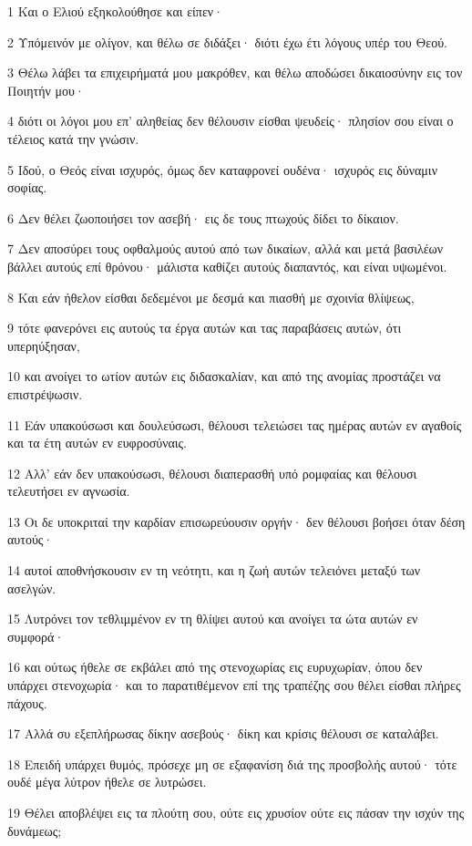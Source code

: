 \par 1 Και ο Ελιού εξηκολούθησε και είπεν·
\par 2 Υπόμεινόν με ολίγον, και θέλω σε διδάξει· διότι έχω έτι λόγους υπέρ του Θεού.
\par 3 Θέλω λάβει τα επιχειρήματά μου μακρόθεν, και θέλω αποδώσει δικαιοσύνην εις τον Ποιητήν μου·
\par 4 διότι οι λόγοι μου επ' αληθείας δεν θέλουσιν είσθαι ψευδείς· πλησίον σου είναι ο τέλειος κατά την γνώσιν.
\par 5 Ιδού, ο Θεός είναι ισχυρός, όμως δεν καταφρονεί ουδένα· ισχυρός εις δύναμιν σοφίας.
\par 6 Δεν θέλει ζωοποιήσει τον ασεβή· εις δε τους πτωχούς δίδει το δίκαιον.
\par 7 Δεν αποσύρει τους οφθαλμούς αυτού από των δικαίων, αλλά και μετά βασιλέων βάλλει αυτούς επί θρόνου· μάλιστα καθίζει αυτούς διαπαντός, και είναι υψωμένοι.
\par 8 Και εάν ήθελον είσθαι δεδεμένοι με δεσμά και πιασθή με σχοινία θλίψεως,
\par 9 τότε φανερόνει εις αυτούς τα έργα αυτών και τας παραβάσεις αυτών, ότι υπερηύξησαν,
\par 10 και ανοίγει το ωτίον αυτών εις διδασκαλίαν, και από της ανομίας προστάζει να επιστρέψωσιν.
\par 11 Εάν υπακούσωσι και δουλεύσωσι, θέλουσι τελειώσει τας ημέρας αυτών εν αγαθοίς και τα έτη αυτών εν ευφροσύναις.
\par 12 Αλλ' εάν δεν υπακούσωσι, θέλουσι διαπερασθή υπό ρομφαίας και θέλουσι τελευτήσει εν αγνωσία.
\par 13 Οι δε υποκριταί την καρδίαν επισωρεύουσιν οργήν· δεν θέλουσι βοήσει όταν δέση αυτούς·
\par 14 αυτοί αποθνήσκουσιν εν τη νεότητι, και η ζωή αυτών τελειόνει μεταξύ των ασελγών.
\par 15 Λυτρόνει τον τεθλιμμένον εν τη θλίψει αυτού και ανοίγει τα ώτα αυτών εν συμφορά·
\par 16 και ούτως ήθελε σε εκβάλει από της στενοχωρίας εις ευρυχωρίαν, όπου δεν υπάρχει στενοχωρία· και το παρατιθέμενον επί της τραπέζης σου θέλει είσθαι πλήρες πάχους.
\par 17 Αλλά συ εξεπλήρωσας δίκην ασεβούς· δίκη και κρίσις θέλουσι σε καταλάβει.
\par 18 Επειδή υπάρχει θυμός, πρόσεχε μη σε εξαφανίση διά της προσβολής αυτού· τότε ουδέ μέγα λύτρον ήθελε σε λυτρώσει.
\par 19 Θέλει αποβλέψει εις τα πλούτη σου, ούτε εις χρυσίον ούτε εις πάσαν την ισχύν της δυνάμεως;
